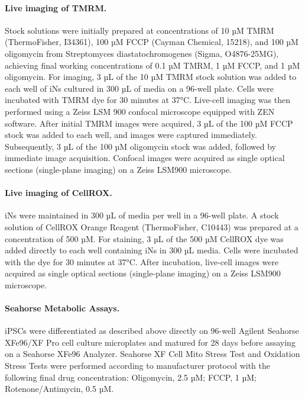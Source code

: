 \documentclass[12pt]{article}
\begin{document}
\paragraph{Live imaging of TMRM.}
Stock solutions were initially prepared at concentrations of 10 µM TMRM (ThermoFisher, I34361), 100 µM FCCP (Cayman Chemical, 15218), and 100 µM oligomycin from Streptomyces diastatochromogenes (Sigma, O4876-25MG), achieving final working concentrations of 0.1 µM TMRM, 1 µM FCCP, and 1 µM oligomycin. For imaging, 3 µL of the 10 µM TMRM stock solution was added to each well of iNs cultured in 300 µL of media on a 96-well plate. Cells were incubated with TMRM dye for 30 minutes at 37°C. Live-cell imaging was then performed using a Zeiss LSM 900 confocal microscope equipped with ZEN software. After initial TMRM images were acquired, 3 µL of the 100 µM FCCP stock was added to each well, and images were captured immediately. Subsequently, 3 µL of the 100 µM oligomycin stock was added, followed by immediate image acquisition. Confocal images were acquired as single optical sections (single-plane imaging) on a Zeiss LSM900 microscope.

\paragraph{Live imaging of CellROX.}
iNs were maintained in 300 µL of media per well in a 96-well plate. A stock solution of CellROX Orange Reagent (ThermoFisher, C10443) was prepared at a concentration of 500 µM. For staining, 3 µL of the 500 µM CellROX dye was added directly to each well containing iNs in 300 µL media. Cells were incubated with the dye for 30 minutes at 37°C. After incubation, live-cell images were acquired as single optical sections (single-plane imaging) on a Zeiss LSM900 microscope.

\paragraph{Seahorse Metabolic Assays.}
iPSCs were differentiated as described above directly on 96-well Agilent Seahorse XFe96/XF Pro cell culture microplates and matured for 28 days before assaying on a Seahorse XFe96 Analyzer. Seahorse XF Cell Mito Stress Test and Oxidation Stress Tests were performed according to manufacturer protocol with the following final drug concentration: Oligomycin, 2.5 µM; FCCP, 1 µM; Rotenone/Antimycin, 0.5 µM. 
\end{document}
